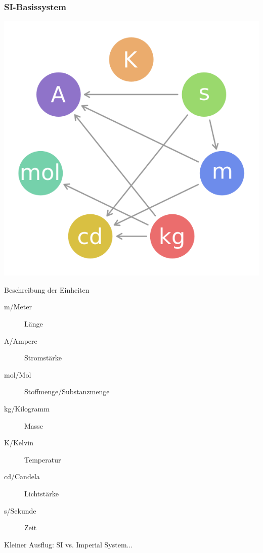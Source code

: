 \begin{frame}
    \frametitle{SI-Basissystem}

    \begin{center}
        \includegraphics[height=0.75\textheight]{e01/SI_base_unit.png}
        \tiny \hyperlink{refs}{\cite{wc}}
    \end{center}

\end{frame}

\begin{frame}

    \begin{block}{Beschreibung der Einheiten}
      \begin{description}
        \item[m/Meter] Länge
        \item[A/Ampere] Stromstärke
        \item[mol/Mol] Stoffmenge/Substanzmenge
        \item[kg/Kilogramm] Masse
        \item[K/Kelvin] Temperatur
        \item[cd/Candela] Lichtstärke    
        \item[s/Sekunde] Zeit    
      \end{description}
    \end{block}
  
    \pause
    Kleiner Ausflug: SI vs. Imperial System...

\end{frame}


